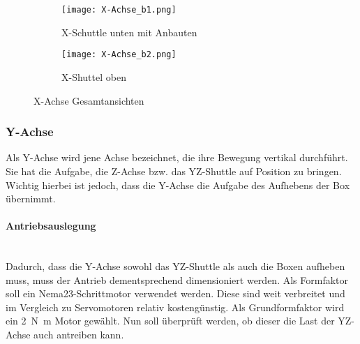 \begin{figure}[H]
    \centering
    \begin{subfigure}{.5\textwidth}
        \centering
        \texttt{[image: X-Achse\_b1.png]}
        \caption{X-Schuttle unten mit Anbauten}
        \label{X-Achse_b1}
    \end{subfigure}%
    \begin{subfigure}{.5\textwidth}
        \centering
        \texttt{[image: X-Achse\_b2.png]}
        \caption{X-Shuttel oben}
        \label{X-Achse_b2}
    \end{subfigure}
    \caption{X-Achse Gesamtansichten}
    \label{X-Achse_ansichten2}
\end{figure}


\subsubsection{Y-Achse}
Als Y-Achse wird jene Achse bezeichnet, die ihre Bewegung vertikal durchführt. Sie hat die Aufgabe, die Z-Achse bzw. das YZ-Shuttle auf Position zu bringen. Wichtig hierbei ist jedoch, dass die Y-Achse die Aufgabe des Aufhebens der Box übernimmt.

\paragraph{Antriebsauslegung}\mbox{}\\
Dadurch, dass die Y-Achse sowohl das YZ-Shuttle als auch die Boxen aufheben muss, muss der Antrieb dementsprechend dimensioniert werden. Als Formfaktor soll ein Nema23-Schrittmotor verwendet werden. Diese sind weit verbreitet und im Vergleich zu Servomotoren relativ kostengünstig. Als Grundformfaktor wird ein \SI{2}{\newton\meter} Motor gewählt. Nun soll überprüft werden, ob dieser die Last der YZ-Achse auch antreiben kann.

